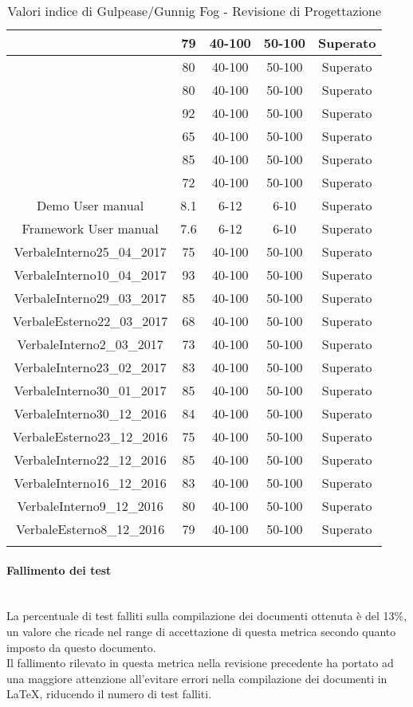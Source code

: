 \begin{longtable}{|c|c|c|c|c|}
	\hline \NormeDiProgetto{} & 79 & 40-100 & 50-100 & Superato\\
	\hline \PianoDiProgetto{} & 80 & 40-100 & 50-100 & Superato \\
	\hline \PianoDiQualifica{} & 80 & 40-100 & 50-100 & Superato \\
	\hline \AnalisiDeiRequisiti{} & 92 & 40-100 & 50-100 & Superato \\
	\hline \Glossario{} & 65 & 40-100 & 50-100 & Superato \\
	\hline \SpecificaTecnica{} & 85 & 40-100 & 50-100 & Superato\\
	\hline \DefinizioneDiProdotto{} & 72 & 40-100 & 50-100 & Superato\\
	\hline Demo User manual & 8.1 & 6-12 & 6-10 & Superato\\
	\hline Framework User manual & 7.6 & 6-12 & 6-10 & Superato\\
	\hline VerbaleInterno25\_04\_2017 & 75 & 40-100 & 50-100 & Superato \\
	\hline VerbaleInterno10\_04\_2017 & 93 & 40-100 & 50-100 & Superato \\
	\hline VerbaleInterno29\_03\_2017 & 85 & 40-100 & 50-100 & Superato \\
	\hline VerbaleEsterno22\_03\_2017 & 68 & 40-100 & 50-100 & Superato \\
	\hline VerbaleInterno2\_03\_2017 & 73 & 40-100 & 50-100 & Superato \\
	\hline VerbaleInterno23\_02\_2017 & 83 & 40-100 & 50-100 & Superato \\
	\hline VerbaleInterno30\_01\_2017 & 85 & 40-100 & 50-100 & Superato \\
	\hline VerbaleInterno30\_12\_2016 & 84 & 40-100 & 50-100 & Superato \\
	\hline VerbaleEsterno23\_12\_2016 & 75 & 40-100 & 50-100 & Superato \\
	\hline VerbaleInterno22\_12\_2016 & 85 & 40-100 & 50-100 & Superato \\
	\hline VerbaleInterno16\_12\_2016 & 83 & 40-100 & 50-100 & Superato \\
	\hline VerbaleInterno9\_12\_2016 & 80 & 40-100 & 50-100 & Superato \\
	\hline VerbaleEsterno8\_12\_2016 & 79 & 40-100 & 50-100 & Superato \\
	\hline
	\caption{Valori indice di Gulpease/Gunnig Fog - Revisione di Progettazione}
\end{longtable}


\paragraph{Fallimento dei test}\mbox{}\\
La percentuale di test falliti sulla compilazione dei documenti ottenuta è del 13\%, un valore che ricade nel range di accettazione di questa metrica secondo quanto imposto da questo documento. 
\\Il fallimento rilevato in questa metrica nella revisione precedente ha portato ad una maggiore attenzione all'evitare errori nella compilazione dei documenti in \LaTeX, riducendo il numero di test falliti.

